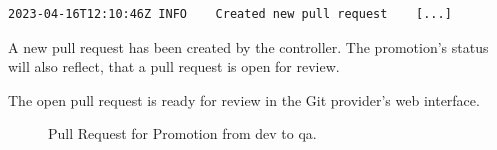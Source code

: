 \begin{lstlisting}
2023-04-16T12:10:46Z INFO    Created new pull request    [...]
\end{lstlisting}

A new pull request
has been created by the controller.
The promotion's status will also reflect, that
a pull request is open for review.



The open pull request is ready for review in the Git provider's web interface.
\begin{figure}[h]
	\centering
	\caption{Pull Request for Promotion from dev to qa.
	}
	\label{fig:prom-pr-dev-to-qa}	
\end{figure}

